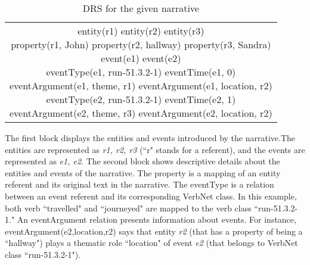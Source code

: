 \documentclass[12pt,letterpaper]{article}
\begin{document}
	\begin{wraptable}{l}{10cm}
		\centering
		\begin{tabular}{|c|}
			\hline
			\thead{\textit{\footnosize r1 r2 r3 e1 e2}} \\
			\hline
			\makecell{\scriptsize entity(r1) entity(r2) entity(r3)\\
				\scriptsize property(r1, John) property(r2, hallway)              property(r3, Sandra) \\
				\scriptsize event(e1) event(e2) \\
				\scriptsize eventType(e1, run-51.3.2-1) eventTime(e1, 0) \\
				\scriptsize eventArgument(e1, theme, r1) eventArgument(e1, location, r2) \\
				\scriptsize eventType(e2, run-51.3.2-1) eventTime(e2, 1) \\
				\scriptsize eventArgument(e2, theme, r3) eventArgument(e2, location, r2)} \\
			\hline		
		\end{tabular}
		\caption{\footnosize DRS for the given narrative}
		\label{table:drs}
	\end{wraptable}
	
	\noindent The first block displays the entities and events introduced by the narrative.The entities are represented as \textit{r1, r2, r3} (``r" stands for a referent), and the events are represented as \textit{e1, e2}. The second block shows descriptive details about the entities and events of the narrative. The property is a mapping of an entity referent and its original text in the narrative. The eventType is a relation between an event referent and its corresponding VerbNet class. In this example, both verb ``travelled" and ``journeyed" are mapped to the verb class ``run-51.3.2-1." An eventArgument relation presents information about events. For instance, eventArgument(e2,location,r2) says that entity \textit{r2} (that has a property of being a ``hallway") plays a thematic role ``location" of event \textit{e2} (that belongs to VerbNet class ``run-51.3.2-1").
	\newline
	
\end{document}

